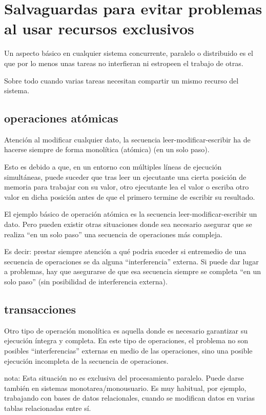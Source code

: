 \documentclass[spanish,12pt,a4paper,final,oneside]{book}
\begin{document}
\section{Salvaguardas para evitar problemas al usar recursos exclusivos}

Un aspecto básico en cualquier sistema concurrente, paralelo o distribuido es el que por lo menos unas tareas no interfieran ni estropeen el trabajo de otras. 

Sobre todo cuando varias tareas necesitan compartir un mismo recurso del sistema.

\subsection{operaciones atómicas}
Atención al modificar cualquier dato, la secuencia leer-modificar-escribir ha de hacerse siempre de forma monolítica (atómica) (en un solo paso).

Esto es debido a que, en un entorno con múltiples líneas de ejecución simultáneas, puede suceder que tras leer un ejecutante una cierta posición de memoria para trabajar con su valor, otro ejecutante lea el valor o escriba otro valor en dicha posición antes de que el primero termine de escribir su resultado. 

El ejemplo básico de operación atómica es la secuencia leer-modificar-escribir un dato. Pero pueden existir otras situaciones donde sea necesario asegurar que se realiza ``en un solo paso'' una secuencia de operaciones más compleja. 

Es decir: prestar siempre atención a qué podria suceder si entremedio de una secuencia de operaciones se da alguna ``interferencia'' externa. Si puede dar lugar a problemas, hay que asegurarse de que esa secuencia siempre se completa ``en un solo paso'' (sin posibilidad de interferencia externa).

\subsection{transacciones}
Otro tipo de operación monolítica es aquella donde es necesario garantizar su ejecución íntegra y completa. En este tipo de operaciones, el problema no son posibles ``interferencias'' externas en medio de las operaciones, sino una posible ejecución incompleta de la secuencia de operaciones.

nota: Esta situación no es exclusiva del procesamiento paralelo. Puede darse también en sistemas monotarea/monousuario. Es muy habitual, por ejemplo, trabajando con bases de datos relacionales, cuando se modifican datos en varias tablas relacionadas entre sí.
\end{document}
